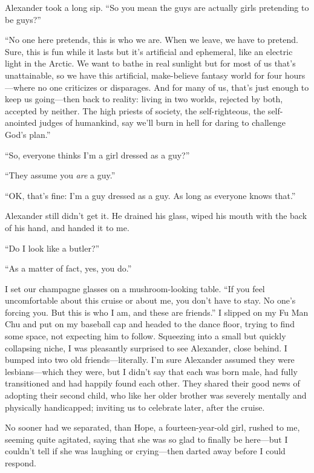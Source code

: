 Alexander took a long sip. ``So you mean the guys are actually girls
pretending to be guys?''

``No one here pretends, this is who we are. When we leave, we have to
pretend. Sure, this is fun while it lasts but it's artificial and
ephemeral, like an electric light in the Arctic. We want to bathe in
real sunlight but for most of us that's unattainable, so we have this
artificial, make-believe fantasy world for four hours---where no one
criticizes or disparages. And for many of us, that's just enough to keep
us going---then back to reality: living in two worlds, rejected by both,
accepted by neither. The high priests of society, the self-righteous,
the self-anointed judges of humankind, say we'll burn in hell for daring
to challenge God's plan.''

``So, everyone thinks I'm a girl dressed as a guy?''

``They assume you \emph{are} a guy.''

``OK, that's fine: I'm a guy dressed as a guy. As long as everyone knows
that.''

Alexander still didn't get it. He drained his glass, wiped his mouth
with the back of his hand, and handed it to me.

``Do I look like a butler?''

``As a matter of fact, yes, you do.''

I set our champagne glasses on a mushroom-looking table. ``If you feel
uncomfortable about this cruise or about me, you don't have to stay. No
one's forcing you. But this is who I am, and these are friends.'' I
slipped on my Fu Man Chu and put on my baseball cap and headed to the
dance floor, trying to find some space, not expecting him to follow.
Squeezing into a small but quickly collapsing niche, I was pleasantly
surprised to see Alexander, close behind. I bumped into two old
friends---literally. I'm sure Alexander assumed they were
lesbians---which they were, but I didn't say that each was born male,
had fully transitioned and had happily found each other. They shared
their good news of adopting their second child, who like her older
brother was severely mentally and physically handicapped; inviting us to
celebrate later, after the cruise.

No sooner had we separated, than Hope, a fourteen-year-old girl, rushed
to me, seeming quite agitated, saying that she was so glad to finally be
here---but I couldn't tell if she was laughing or crying---then darted
away before I could respond.

